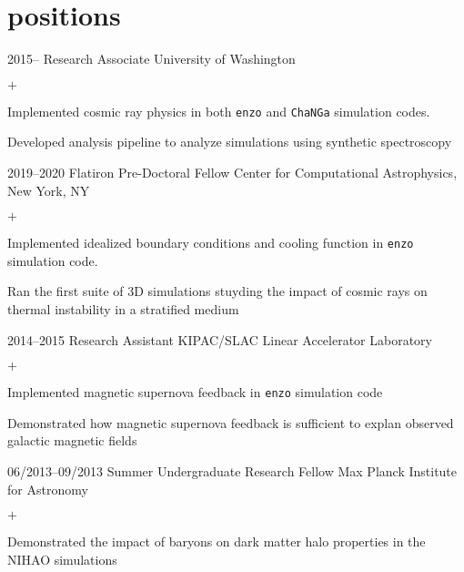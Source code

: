 \documentclass[]{luger-cv} %
\begin{document}
\section{positions}
\begin{entrylist}


\entry
{2015--}
{Research Associate}
{University of Washington}
{%
\vspace{-1em}
\begin{list}{$+$}{\cvlist}
\item Implemented cosmic ray physics in both \texttt{enzo} and \texttt{ChaNGa} simulation codes.
\item Developed analysis pipeline to analyze simulations using synthetic spectroscopy
\end{list}
}


\entry
{2019--2020}
{Flatiron Pre-Doctoral Fellow}
{Center for Computational Astrophysics, New York, NY}
{%
\vspace{-1em}
\begin{list}{$+$}{\cvlist}
\item Implemented idealized boundary conditions and cooling function in \texttt{enzo} simulation code.
\item Ran the first suite of 3D simulations stuyding the impact of cosmic rays on thermal instability in a stratified medium
\end{list}
}


\entry
{2014--2015}
{Research Assistant}
{KIPAC/SLAC Linear Accelerator Laboratory}
{%
\vspace{-1em}
\begin{list}{$+$}{\cvlist}
\item Implemented magnetic supernova feedback in \texttt{enzo} simulation code
\item Demonstrated how magnetic supernova feedback is sufficient to explan observed galactic magnetic fields
\end{list}
}


\ifdefined \onepage \else
\entry
{06/2013--09/2013}
{Summer Undergraduate Research Fellow}
{Max Planck Institute for Astronomy}
{%
\vspace{-1em}
\begin{list}{$+$}{\cvlist}
\item Demonstrated the impact of baryons on dark matter halo properties in the NIHAO simulations
\end{list}
}


\end{entrylist}
\end{document}
